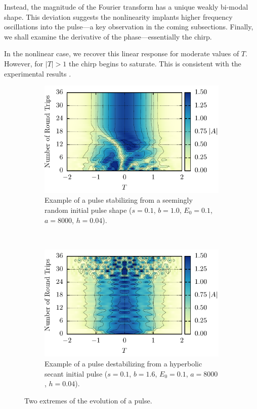 \documentclass[10pt,twocolumn,a4paper]{article}
\begin{document}
Instead, the magnitude of the Fourier transform has a unique weakly bi-modal shape. This deviation suggests the nonlinearity implants higher frequency oscillations into the pulse---a key observation in the coming subsections. Finally, we shall examine the derivative of the phase---essentially the chirp.

 In the nonlinear case, we recover this linear response for moderate values of $T$. However, for $|T| > 1$ the chirp begins to saturate. This is consistent with the experimental results \cite{chen, rothenberg, tomlinson}.

\begin{figure}[tb]
	\centering
	\begin{subfigure}{\columnwidth}
		\centering
		\includegraphics{Conv}
		\caption{Example of a pulse stabilizing from a seemingly random initial pulse shape ($s = 0.1$, $b = 1.0$, $E_0 = 0.1$, $a = 8000$, $h = 0.04$).}
		\label{fig:convevo}
	\end{subfigure} \\
	\begin{subfigure}{\columnwidth}
		\centering
		\includegraphics{Break}
		\caption{Example of a pulse destabilizing from a hyperbolic secant initial pulse ($s = 0.1$, $b = 1.6$, $E_0 = 0.1$, $a = 8000$, $h = 0.04$).}
		\label{fig:breakevo}
	\end{subfigure}
	\caption{Two extremes of the evolution of a pulse.}
	\label{fig:evolution}
\end{figure}
\end{document}
